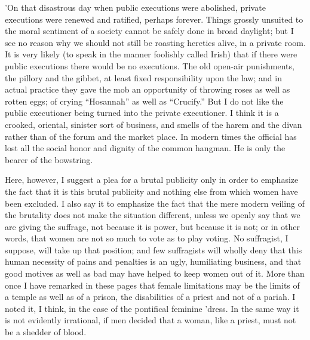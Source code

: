 \documentclass{book}
\begin{document}
’On that disastrous day when public executions were abolished, private executions were renewed and ratified, perhaps forever. Things grossly unsuited to the moral sentiment of a society cannot be safely done in broad daylight; but I see no reason why we should not still be roasting heretics alive, in a private room. It is very likely (to speak in the manner foolishly called Irish) that if there were public executions there would be no executions. The old open-air punishments, the pillory and the gibbet, at least fixed responsibility upon the law; and in actual practice they gave the mob an opportunity of throwing roses as well as rotten eggs; of crying “Hosannah” as well as “Crucify.” But I do not like the public executioner being turned into the private executioner. I think it is a crooked, oriental, sinister sort of business, and smells of the harem and the divan rather than of the forum and the market place. In modern times the official has lost all the social honor and dignity of the common hangman. He is only the bearer of the bowstring.

Here, however, I suggest a plea for a brutal publicity only in order to emphasize the fact that it is this brutal publicity and nothing else from which women have been excluded. I also say it to emphasize the fact that the mere modern veiling of the brutality does not make the situation different, unless we openly say that we are giving the suffrage, not because it is power, but because it is not; or in other words, that women are not so much to vote as to play voting. No suffragist, I suppose, will take up that position; and few suffragists will wholly deny that this human necessity of pains and penalties is an ugly, humiliating business, and that good motives as well as bad may have helped to keep women out of it. More than once I have remarked in these pages that female limitations may be the limits of a temple as well as of a prison, the disabilities of a priest and not of a pariah. I noted it, I think, in the case of the pontifical feminine ’dress. In the same way it is not evidently irrational, if men decided that a woman, like a priest, must not be a shedder of blood.
\end{document}
